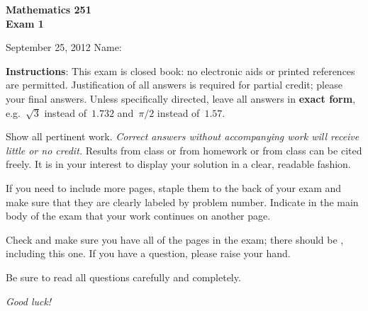 \documentclass[11pt]{exam}
\begin{document}
\addpoints

\noindent
\textbf{{\large Mathematics 251 \\ Exam 1}}

\noindent
September 25, 2012  \hfill Name: \underline{\hspace{3in}}


\noindent
\textbf{Instructions}: This exam is closed book: no electronic aids or
printed references are permitted. Justification of all answers is required
for partial credit; please  your final answers. Unless
specifically directed, leave all answers in \textbf{exact form}, e.g.\
$\sqrt{3}$ instead of~$1.732$ and~$\pi/2$ instead of~$1.57$.

Show all pertinent work. \emph{Correct answers without accompanying work will receive little or no credit.} Results from class or from homework or from class can be cited freely. It is in your interest to display your solution in a
clear, readable fashion.

If you need to include more pages, staple them to the back of your exam and make sure that they are clearly labeled by problem number. Indicate in the main body of the exam that your work continues on another page.

Check and make sure you have all of the pages in the
exam; there should be \numpages, including this one. If you have a
question, please raise your hand.

Be sure to read all questions carefully and completely.

\vspace*{2in}

\begin{center}
\gradetable
\end{center}

\vspace*{0.5in}

\begin{center}
{\Large \emph{Good luck!}}
\end{center}

\newpage
\end{document}
